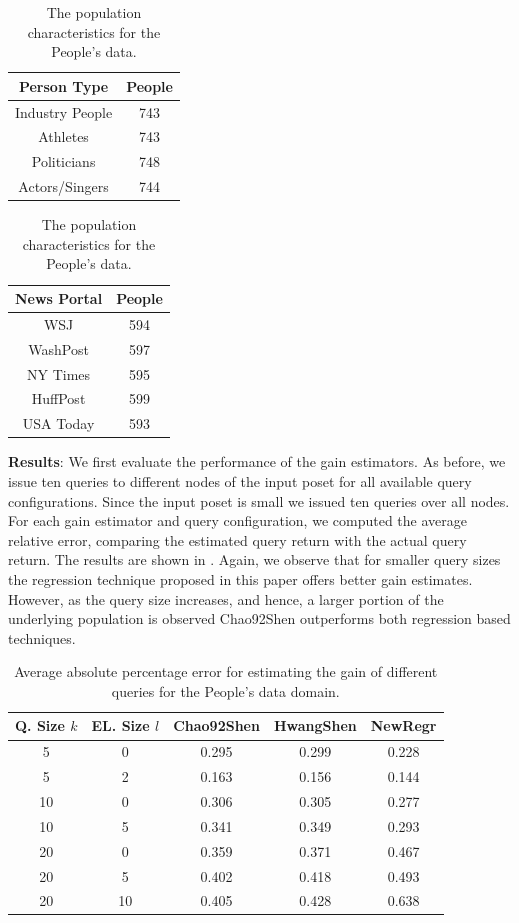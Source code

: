\begin{table}
\center
\caption{The population characteristics for the People's data.}
\label{tab:ptypedata}
\begin{tabular}{|c|c|}
\hline
\textbf{Person Type} & \textbf{People} \\ \hline
Industry People & 743 \\
Athletes & 743 \\
Politicians & 748 \\
Actors/Singers & 744 \\ \hline
\end{tabular}
\quad
\begin{tabular}{|c|c|}
\hline
\textbf{News Portal} & \textbf{People} \\ \hline
WSJ & 594 \\
WashPost & 597 \\
NY Times & 595 \\
HuffPost & 599 \\
USA Today & 593 \\ \hline
\end{tabular}
\vspace{-10pt}
\end{table}


\vspace{5pt}\noindent\textbf{Results}: We first evaluate the performance of the gain estimators. As before, we issue ten queries to different nodes of the input poset for all available query configurations. Since the input poset is small we issued ten queries over all nodes. For each gain estimator and query configuration, we computed the average relative error, comparing the estimated query return with the actual query return. The results are shown in . Again, we observe that for smaller query sizes the regression technique proposed in this paper offers better gain estimates. However, as the query size increases, and hence, a larger portion of the underlying population is observed Chao92Shen outperforms both regression based techniques. 

\begin{table}[h]
\vspace{-15pt}
\small\center
\caption{Average absolute percentage error for estimating the gain of different queries for the People's data domain.}
\label{tab:peopleesterror}
\begin{tabular}{|c|c|c|c|c|}
\hline
\textbf{Q. Size $k$} & \textbf{EL. Size $l$} & \textbf{Chao92Shen} & \textbf{HwangShen} & \textbf{NewRegr} \\ \hline
5 & 0 & 0.295 & 0.299 & 0.228\\
5 & 2 & 0.163 &  0.156 & 0.144\\
10 & 0 &  0.306 & 0.305 & 0.277\\
10 & 5 &  0.341 & 0.349 & 0.293\\
20 & 0 &  0.359& 0.371 & 0.467 \\
20 & 5 &  0.402 & 0.418 & 0.493\\
20 & 10 & 0.405 & 0.428 & 0.638\\
\hline
\end{tabular}
\vspace{-5pt}
\end{table}


